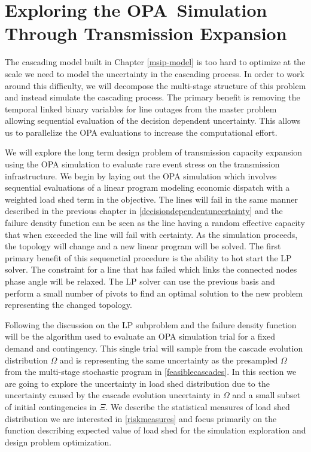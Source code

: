 \chapter{Exploring the OPA~Simulation Through Transmission Expansion}\label{dfo-chapter}

The cascading model built in Chapter \ref{msip-model} is too hard to optimize at the scale we need to model the uncertainty in the cascading process.  In order to work around this difficulty, we will decompose the multi-stage structure of this problem and instead simulate the cascading process.  The primary benefit is removing the temporal linked binary variables for line outages from the master problem allowing sequential evaluation of the decision dependent uncertainty.  This allows us to parallelize the OPA evaluations to increase the computational effort.

We will explore the long term design problem of transmission capacity expansion using the OPA simulation to evaluate rare event stress on the transmission infrastructure.  We begin by laying out the OPA simulation which involves sequential evaluations of a linear program modeling economic dispatch with a weighted load shed term in the objective.  The lines will fail in the same manner described in the previous chapter in \cref{decisiondependentuncertainty} and the failure density function can be seen as the line having a random effective capacity that when exceeded the line will fail with certainty.  As the simulation proceeds, the topology will change and a new linear program will be solved.  The first primary benefit of this sequenctial procedure is the ability to hot start the LP solver.  The constraint for a line that has failed which links the connected nodes phase angle will be relaxed.  The LP solver can use the previous basis and perform a small number of pivots to find an optimal solution to the new problem representing the changed topology.

Following the discussion on the LP subproblem and the failure density function will be the algorithm used to evaluate an OPA simulation trial for a fixed demand and contingency.  This single trial will sample from the cascade evolution distribution $\Omega$ and is representing the same uncertainty as the presampled $\Omega$ from the multi-stage stochastic program in \cref{feasiblecascades}.  In this section we are going to explore the uncertainty in load shed distribution due to the uncertainty caused by the cascade evolution uncertainty in $\Omega$ and a small subset of initial contingencies in $\Xi$. We describe the statistical measures of load shed distribution we are interested in \cref{riskmeasures} and focus primarily on the function describing expected value of load shed for the simulation exploration and design problem optimization.

